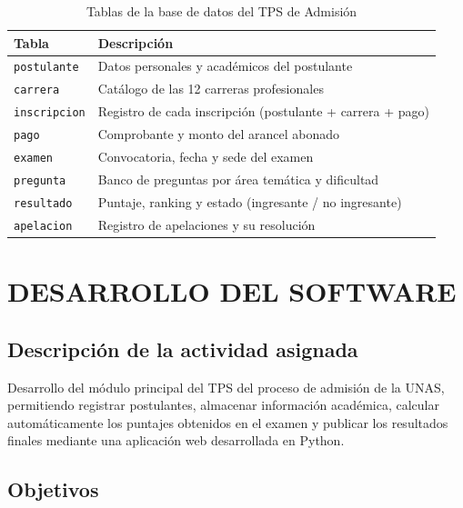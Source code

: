 \documentclass[12pt, a4paper]{report}
\begin{document}
\begin{table}[H]
  \centering
  \caption{Tablas de la base de datos del TPS de Admisión}
  \label{tab:tablas}
  \begin{tabular}{p{4cm} p{8cm}}
    \toprule
    \textbf{Tabla} & \textbf{Descripción} \\
    \midrule
    \texttt{postulante} & Datos personales y académicos del postulante \\
    \texttt{carrera} & Catálogo de las 12 carreras profesionales \\
    \texttt{inscripcion} & Registro de cada inscripción (postulante + carrera + pago) \\
    \texttt{pago} & Comprobante y monto del arancel abonado \\
    \texttt{examen} & Convocatoria, fecha y sede del examen \\
    \texttt{pregunta} & Banco de preguntas por área temática y dificultad \\
    \texttt{resultado} & Puntaje, ranking y estado (ingresante / no ingresante) \\
    \texttt{apelacion} & Registro de apelaciones y su resolución \\
    \bottomrule
  \end{tabular}
\end{table}

\section{DESARROLLO DEL SOFTWARE}

\subsection{Descripción de la actividad asignada}

Desarrollo del módulo principal del TPS del proceso de admisión de la UNAS, permitiendo registrar postulantes, almacenar información académica, calcular automáticamente los puntajes obtenidos en el examen y publicar los resultados finales mediante una aplicación web desarrollada en Python.

\subsection{Objetivos}
\end{document}
